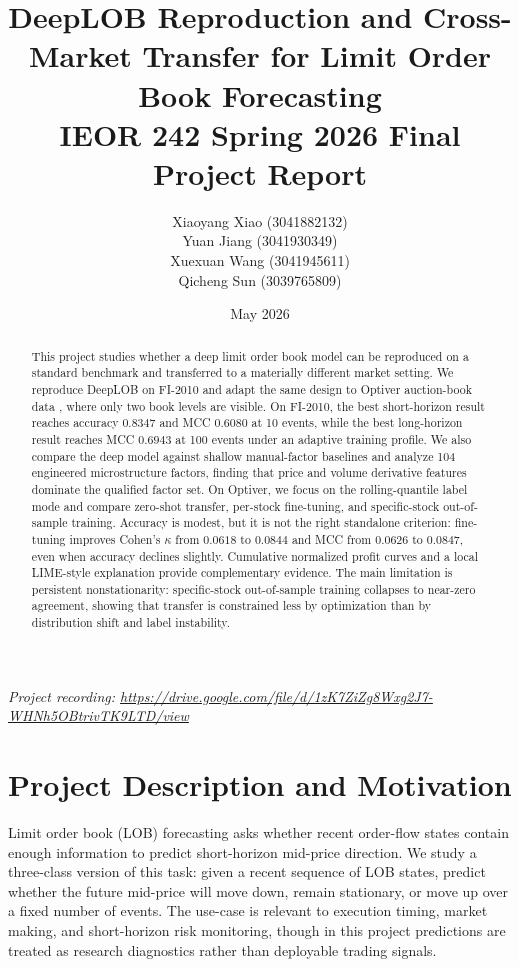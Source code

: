 \documentclass[11pt]{article}
\title{\textbf{DeepLOB Reproduction and Cross-Market Transfer for Limit Order Book Forecasting}\\\large IEOR 242 Spring 2026 Final Project Report}
\author{Xiaoyang Xiao (3041882132)\\Yuan Jiang (3041930349)\\Xuexuan Wang (3041945611)\\Qicheng Sun (3039765809)}
\date{May 2026}
\begin{document}
\maketitle

\noindent\textit{Project recording: \url{https://drive.google.com/file/d/1zK7ZiZg8Wxg2J7-WHNh5OBtrivTK9LTD/view}}

\begin{abstract}
This project studies whether a deep limit order book model can be reproduced on a standard benchmark and transferred to a materially different market setting. We reproduce DeepLOB on FI-2010 \cite{zhang2019deeplob,ntakaris2018benchmark} and adapt the same design to Optiver auction-book data \cite{optiverkaggle}, where only two book levels are visible. On FI-2010, the best short-horizon result reaches accuracy $0.8347$ and MCC $0.6080$ at 10 events, while the best long-horizon result reaches MCC $0.6943$ at 100 events under an adaptive training profile. We also compare the deep model against shallow manual-factor baselines and analyze 104 engineered microstructure factors, finding that price and volume derivative features dominate the qualified factor set. On Optiver, we focus on the rolling-quantile label mode and compare zero-shot transfer, per-stock fine-tuning, and specific-stock out-of-sample training. Accuracy is modest, but it is not the right standalone criterion: fine-tuning improves Cohen's $\kappa$ from $0.0618$ to $0.0844$ and MCC from $0.0626$ to $0.0847$, even when accuracy declines slightly. Cumulative normalized profit curves and a local LIME-style explanation provide complementary evidence. The main limitation is persistent nonstationarity: specific-stock out-of-sample training collapses to near-zero agreement, showing that transfer is constrained less by optimization than by distribution shift and label instability.
\end{abstract}

\section{Project Description and Motivation}
Limit order book (LOB) forecasting asks whether recent order-flow states contain enough information to predict short-horizon mid-price direction. We study a three-class version of this task: given a recent sequence of LOB states, predict whether the future mid-price will move down, remain stationary, or move up over a fixed number of events. The use-case is relevant to execution timing, market making, and short-horizon risk monitoring, though in this project predictions are treated as research diagnostics rather than deployable trading signals.
\end{document}
